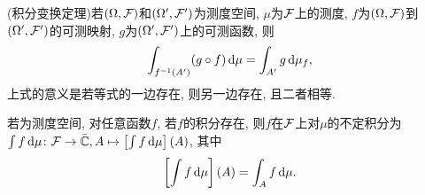 \begin{theorem}
    (积分变换定理)若$(\Omega,\mathcal{F})$和$(\Omega',\mathcal{F}')$为测度空间, $\mu$为$\mathcal{F}$上的测度, $f$为$(\Omega,\mathcal{F})$到$(\Omega',\mathcal{F}')$的可测映射, $g$为$(\Omega',\mathcal{F}')$上的可测函数, 则
    \begin{equation}
        \int_{f^{-1}(A')}(g\circ f)\,\mathrm{d}\mu=\int_{A'}g\,\mathrm{d}\mu_f,
    \end{equation}
    上式的意义是\colon 若等式的一边存在, 则另一边存在, 且二者相等.
\end{theorem}

\begin{definition}
    若\s{}为测度空间, 对任意函数$f$, 若$f$的积分存在, 则$f$在$\mathcal{F}$上对$\mu$的不定积分为$\int f\,\mathrm{d}\mu\colon\mathcal{F}\to\bar{\mathbb{C}},A\mapsto\left[\int f\,\mathrm{d}\mu\right](A)$, 其中
    \begin{equation}
        \left[\int f\,\mathrm{d}\mu\right](A)=\int_A f\,\mathrm{d}\mu.
    \end{equation}
\end{definition}
